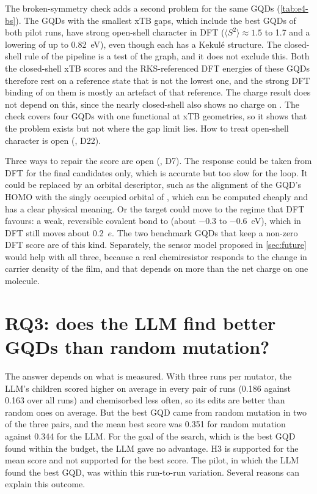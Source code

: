 The broken-symmetry check adds a second problem for the same GQDs (\cref{tab:e4-bs}). The GQDs
with the smallest xTB gaps, which include the best GQDs of both pilot runs, have strong open-shell
character in DFT (\(\langle S^2\rangle \approx 1.5\) to 1.7 and a lowering of up to 0.82~eV), even
though each has a Kekul\'e structure. The closed-shell rule of the pipeline is a test of the
graph, and it does not exclude this. Both the closed-shell xTB scores and the RKS-referenced DFT
energies of these GQDs therefore rest on a reference state that is not the lowest one, and the
strong DFT binding of  on them is mostly an artefact of that reference. The charge result
does not depend on this, since the nearly closed-shell  also shows no charge on
. The check covers four GQDs with one functional at xTB geometries, so it shows that the
problem exists but not where the gap limit lies. How to treat open-shell character is open
(, D22).

Three ways to repair the score are open (, D7). The response could be
taken from DFT for the final candidates only, which is accurate but too slow for the loop. It could
be replaced by an orbital descriptor, such as the alignment of the GQD's HOMO with the singly
occupied orbital of , which can be computed cheaply and has a clear physical meaning. Or the
target could move to the regime that DFT favours: a weak, reversible covalent bond to 
(about \(-0.3\) to \(-0.6\)~eV), which in DFT still moves about 0.2~\(e\). The two benchmark GQDs
that keep a non-zero DFT score are of this kind. Separately, the sensor model proposed in
\cref{sec:future} would help with all three, because a real chemiresistor responds to the change
in carrier density of the film, and that depends on more than the net charge on one molecule.

\section{RQ3: does the LLM find better GQDs than random mutation?}

The answer depends on what is measured. With three runs per mutator, the LLM's children scored
higher on average in every pair of runs (0.186 against 0.163 over all runs) and chemisorbed
 less often, so its edits are better than random ones on average. But the best GQD came
from random mutation in two of the three pairs, and the mean best score was 0.351 for random
mutation against 0.344 for the LLM. For the goal of the search, which is the best GQD found within
the budget, the LLM gave no advantage. H3 is supported for the mean score and not supported for the
best score. The pilot, in which the LLM found the best GQD, was within this run-to-run variation.
Several reasons can explain this outcome.


